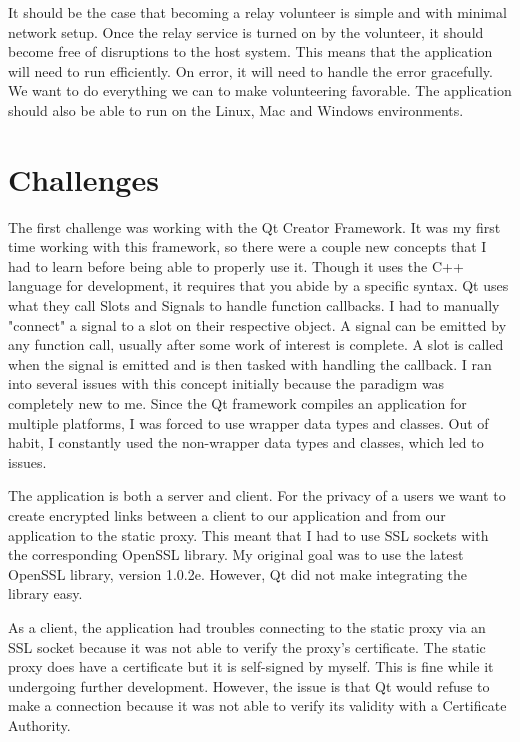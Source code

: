 \documentclass[12pt,a4paper]{report}
\begin{document}
	It should be the case that becoming a relay volunteer is simple and with minimal network setup. Once the relay service is turned on by the volunteer, it should become free of disruptions to the host system. This means that the application will need to run efficiently. On error, it will need to handle the error gracefully. We want to do everything we can to make volunteering favorable. The application should also be able to run on the Linux, Mac and Windows environments. 
	
	\section{Challenges}
	The first challenge was working with the Qt Creator Framework. It was my first time working with this framework, so there were a couple new concepts that I had to learn before being able to properly use it. Though it uses the C++ language for development, it requires that you abide by a specific syntax. Qt uses what they call Slots and Signals to handle function callbacks. I had to manually "connect" a signal to a slot on their respective object. A signal can be emitted by any function call, usually after some work of interest is complete. A slot is called when the signal is emitted and is then tasked with handling the callback. I ran into several issues with this concept initially because the paradigm was completely new to me. Since the Qt framework compiles an application for multiple platforms, I was forced to use wrapper data types and classes. Out of habit, I constantly used the non-wrapper data types and classes, which led to issues.      
	
	The application is both a server and client. For the privacy of a users we want to create encrypted links between a client to our application and from our application to the static proxy. This meant that I had to use SSL sockets with the corresponding OpenSSL library. My original goal was to use the latest OpenSSL library, version 1.0.2e. However, Qt did not make integrating the library easy.
	
	As a client, the application had troubles connecting to the static proxy via an SSL socket because it was not able to verify the proxy's certificate. The static proxy does have a certificate but it is self-signed by myself. This is fine while it undergoing further development. However, the issue is that Qt would refuse to make a connection because it was not able to verify its validity with a Certificate Authority. 
	
\end{document}

